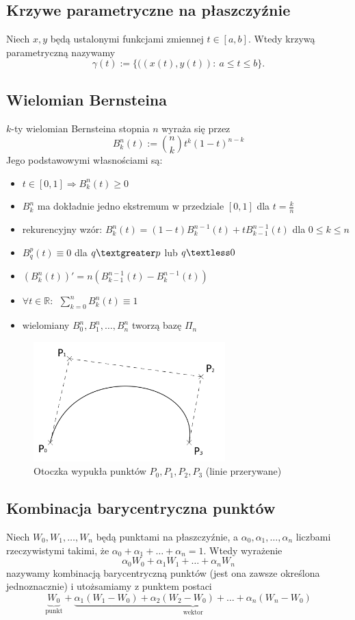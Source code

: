 \documentclass[a4paper,11pt]{article}
\begin{document}
\subsection{Krzywe parametryczne na płaszczyźnie}
Niech $x, y$ będą ustalonymi funkcjami zmiennej $t\in[a,b]$. Wtedy krzywą parametryczną nazywamy
$$ \gamma(t) := \{ ((x(t), y(t)): \ a \leq t \leq b \}. $$

\subsection{Wielomian Bernsteina}
$k$-ty wielomian Bernsteina stopnia $n$ wyraża się przez
$$ B_k^n (t) := \binom{n}{k}t^k(1-t)^{n-k}$$
Jego podstawowymi własnościami są:
\begin{itemize}
\item $t\in[0,1] \Rightarrow B_k^n(t) \geq 0$
\item $B_k^n$ ma dokładnie jedno ekstremum w przedziale $[0,1]$ dla $t=\frac{k}{n}$
\item rekurencyjny wzór: $B_k^n(t)=(1-t)B_k^{n-1}(t)+tB_{k-1}^{n-1}(t)$ dla $0 \leq k \leq n$
\item $B_q^p(t) \equiv 0$ dla $q\textgreater p$ lub $q\textless 0$
\item $  \left( B_k^n(t) \right) ' = n \left(  B_{k-1}^{n-1}(t) - B_k^{n-1}(t) \right)$
\item $\forall t \in \mathbb{R}: \ \   \sum\limits_{k=0}^{n} B_k^n (t) \equiv 1$
\item wielomiany $B_0^n, B_1^n, \ldots, B_n^n$ tworzą bazę $\Pi_n$
\end{itemize}

\begin{figure}[H]
\centering
\includegraphics[width=0.66\textwidth]{otoczkawypukla.png}
\caption{Otoczka wypukła punktów $P_0, P_1, P_2, P_3$ (linie przerywane)}
\label{otoczkawypukla}
\end{figure}

\subsection{Kombinacja barycentryczna punktów}
Niech $W_0, W_1, \ldots, W_n$ będą punktami na płaszczyźnie, a $\alpha_0, \alpha_1, \ldots, \alpha_n$ liczbami rzeczywistymi takimi, że $\alpha_0 + \alpha_1 + \ldots + \alpha_n = 1$. Wtedy wyrażenie
$$ \alpha_0W_0 + \alpha_1W_1 + \ldots + \alpha_n W_n$$
nazywamy kombinacją barycentryczną punktów (jest ona zawsze określona jednoznacznie) i utożsamiamy z punktem postaci
$$\underbrace{W_0}_{\text{punkt}} + \underbrace{\alpha_1(W_1-W_0)+\alpha_2(W_2-W_0)+\ldots+\alpha_n(W_n-W_0)}_{\text{wektor}}$$
\end{document}
